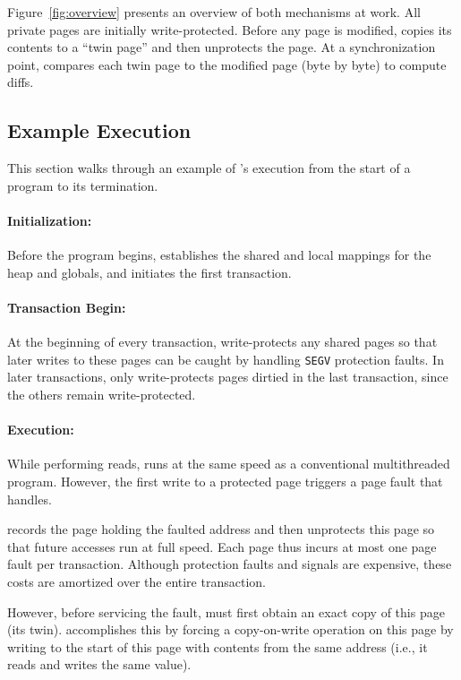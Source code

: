 Figure~\ref{fig:overview} presents an overview of both mechanisms at
work. All private pages are
initially write-protected. Before any page is modified, \sheriff{}
copies its contents to a ``twin page'' and then unprotects the
page. At a synchronization point, \sheriff{} compares each twin page
to the modified page (byte by byte) to compute diffs.

\subsection{Example Execution}
\label{simulation:thread}

This section walks through an example of \sheriff{}'s execution from the start of a program to its termination.


\paragraph{Initialization: } Before the program begins, \sheriff{}
establishes the shared and local mappings for the heap and globals,
and initiates the first transaction.

\paragraph{Transaction Begin:}
At the beginning of every transaction, \sheriff{} write-protects any shared
pages so that later writes to these pages can be caught by
handling \texttt{SEGV} protection faults.  In later transactions,
\sheriff{} only write-protects pages dirtied in the last
transaction, since the others remain write-protected.

\paragraph{Execution: } While performing reads, \sheriff{} runs at
the same speed as a conventional multithreaded
program. However, the first write to a protected page triggers a page
fault that \sheriff{} handles.

\sheriff{} records the page holding the faulted address and then unprotects
this page so that future accesses run at
full speed.  Each page thus incurs at most one page fault per transaction.
Although protection faults and signals are expensive, these costs are
amortized over the entire transaction.

However, before servicing the fault, \sheriff{} must first obtain an
exact copy of this page (its twin). \sheriff{} accomplishes this by
forcing a copy-on-write operation on this page by writing to the start
of this page with contents from the same address (i.e., it
reads and writes the same value).

